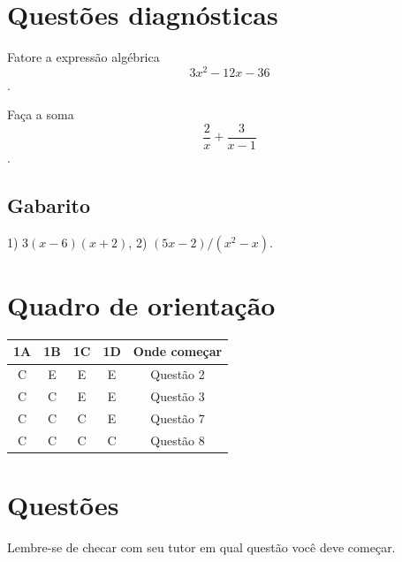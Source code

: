 \documentclass[main.tex]{subfiles}
\begin{document}
\paraAmbos

\section{Questões diagnósticas}

\begin{diagnostico}
Fatore a expressão algébrica $$3x^2-12x-36$$.
\end{diagnostico}
  
\begin{diagnostico}
Faça a soma $$\frac{2}{x}+\frac{3}{x-1}$$.
\end{diagnostico}

\paraTutores
\subsection{Gabarito}

1) $3(x-6)(x+2)$, 2) $(5x-2)/(x^2-x)$.

\section{Quadro de orientação}

\begin{center}
 \begin{tabular}{|c c c c |c|} 
 \hline
 1A & 1B & 1C & 1D & Onde começar\\
 \hline
 C & E & E & E & Questão 2 \\ 
 \hline
 C & C & E & E & Questão 3 \\ 
 \hline
 C & C & C & E & Questão 7 \\ 
 \hline
 C & C & C & C & Questão 8 \\ 
 \hline
\end{tabular}
\end{center}

\paraAmbos

\newpage

\section{Questões}

Lembre-se de checar com seu tutor em qual questão você deve começar.

\paraTutores
\end{document}

